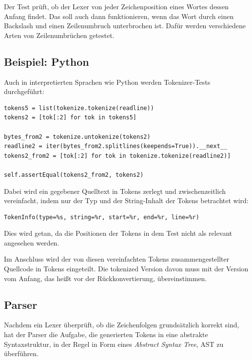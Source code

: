 \documentclass[a4paper,11pt]{article}
\begin{document}
Der Test \parencite{llvm_lexer_test} prüft, ob der Lexer von jeder Zeichenposition eines Wortes dessen Anfang findet. Das soll auch dann funktionieren, wenn das Wort durch einen Backslash und einen Zeilenumbruch unterbrochen ist. Dafür werden verschiedene Arten von Zeilenumbrüchen getestet.

\subsection{Beispiel: Python}

Auch in interpretierten Sprachen wie Python werden Tokenizer-Tests durchgeführt: \parencite{python_test_tokenizer}

\begin{verbatim}
tokens5 = list(tokenize.tokenize(readline))
tokens2 = [tok[:2] for tok in tokens5]

bytes_from2 = tokenize.untokenize(tokens2)
readline2 = iter(bytes_from2.splitlines(keepends=True)).__next__
tokens2_from2 = [tok[:2] for tok in tokenize.tokenize(readline2)]

self.assertEqual(tokens2_from2, tokens2)
\end{verbatim}

Dabei wird ein gegebener Quelltext in Tokens zerlegt und zwischenzeitlich vereinfacht, indem nur der Typ und der String-Inhalt der Tokens betrachtet wird: \parencite{python_tokenizer}

\begin{verbatim}
TokenInfo(type=%s, string=%r, start=%r, end=%r, line=%r)
\end{verbatim}

Dies wird getan, da die Positionen der Tokens in dem Test nicht als relevant angesehen werden.

Im Anschluss wird der von diesen vereinfachten Tokens zusammengestellter Quellcode in Tokens eingeteilt. Die tokenized Version davon muss mit der Version vom Anfang, das heißt vor der Rückkonvertierung, übereinstimmen. \parencite{python_test_tokenizer}


\subsection{Parser}

Nachdem ein Lexer überprüft, ob die Zeichenfolgen grundsätzlich korrekt sind, hat der Parser die Aufgabe, die generierten Tokens in eine abstrakte Syntaxstruktur, in der Regel in Form eines \emph{Abstract Syntax Tree}, AST zu überführen. 
\end{document}
